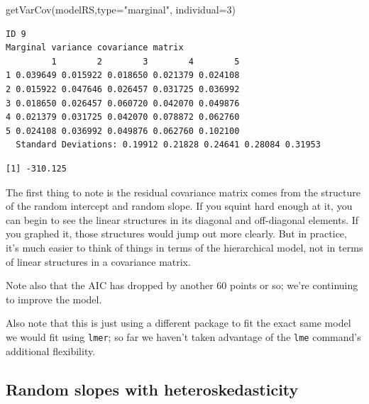 \documentclass[
  letterpaper,
  DIV=11,
  numbers=noendperiod]{scrreprt}
\newenvironment{Shaded}{}{}
\newcommand{\AttributeTok}[1]{\textcolor[rgb]{0.49,0.56,0.16}{#1}}
\newcommand{\DecValTok}[1]{\textcolor[rgb]{0.25,0.63,0.44}{#1}}
\newcommand{\FunctionTok}[1]{\textcolor[rgb]{0.02,0.16,0.49}{#1}}
\newcommand{\NormalTok}[1]{#1}
\newcommand{\SpecialCharTok}[1]{\textcolor[rgb]{0.25,0.44,0.63}{#1}}
\newcommand{\StringTok}[1]{\textcolor[rgb]{0.25,0.44,0.63}{#1}}
\begin{document}
\begin{Shaded}
\begin{Highlighting}[]
\FunctionTok{getVarCov}\NormalTok{(modelRS,}\AttributeTok{type=}\StringTok{"marginal"}\NormalTok{, }\AttributeTok{individual=}\DecValTok{3}\NormalTok{)}
\end{Highlighting}
\end{Shaded}

\begin{verbatim}
ID 9 
Marginal variance covariance matrix
         1        2        3        4        5
1 0.039649 0.015922 0.018650 0.021379 0.024108
2 0.015922 0.047646 0.026457 0.031725 0.036992
3 0.018650 0.026457 0.060720 0.042070 0.049876
4 0.021379 0.031725 0.042070 0.078872 0.062760
5 0.024108 0.036992 0.049876 0.062760 0.102100
  Standard Deviations: 0.19912 0.21828 0.24641 0.28084 0.31953 
\end{verbatim}

\begin{Shaded}
\end{Shaded}

\begin{verbatim}
[1] -310.125
\end{verbatim}

The first thing to note is the residual covariance matrix comes from the
structure of the random intercept and random slope. If you squint hard
enough at it, you can begin to see the linear structures in its diagonal
and off-diagonal elements. If you graphed it, those structures would
jump out more clearly. But in practice, it's much easier to think of
things in terms of the hierarchical model, not in terms of linear
structures in a covariance matrix.

Note also that the AIC has dropped by another 60 points or so; we're
continuing to improve the model.

Also note that this is just using a different package to fit the exact
same model we would fit using \texttt{lmer}; so far we haven't taken
advantage of the \texttt{lme} command's additional flexibility.

\subsection{Random slopes with
heteroskedasticity}\label{random-slopes-with-heteroskedasticity}
\end{document}
